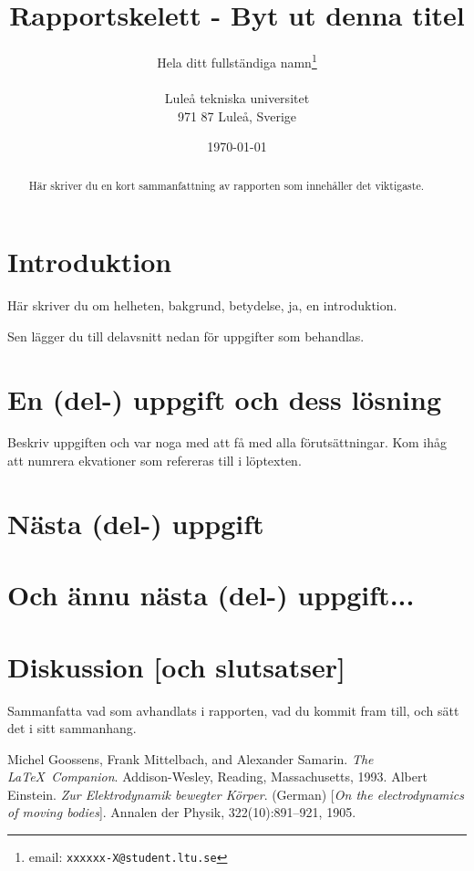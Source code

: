 \documentclass[a4paper,12pt]{article}
\title{Rapportskelett - Byt ut denna titel}
\author{Hela ditt fullständiga namn\thanks{email:
        \texttt{xxxxxx-X@student.ltu.se}}\\  
        ~ \\
        Luleå tekniska universitet \\ 
        971 87 Luleå, Sverige}
\date{\today}
\begin{document}
\linenumbers %

\maketitle

\begin{abstract}
  Här skriver du en kort sammanfattning av rapporten som innehåller
  det viktigaste. 
\end{abstract}

\section{Introduktion}
\label{sec:introduktion}

Här skriver du om helheten, bakgrund, betydelse, ja, en introduktion. 

Sen lägger du till delavsnitt nedan för uppgifter som behandlas.

\section{En (del-) uppgift och dess lösning}
\label{sec:uppg1}

Beskriv uppgiften och var noga med att få med alla förutsättningar.
Kom ihåg att numrera ekvationer som refereras till i löptexten.

\section{Nästa (del-) uppgift}
\label{sec:uppg2}

\section{Och ännu nästa (del-) uppgift...}
\label{sec:uppgN}

\section{Diskussion [och slutsatser]}
\label{sec:disk}

Sammanfatta vad som avhandlats i rapporten, vad du kommit fram till,
och sätt det i sitt sammanhang. 
%
\begin{thebibliography}{99}
%
Michel Goossens, Frank Mittelbach, and Alexander Samarin. 
\textit{The \LaTeX\ Companion}. 
Addison-Wesley, Reading, Massachusetts, 1993.
%
Albert Einstein. 
\textit{Zur Elektrodynamik bewegter K{\"o}rper}. (German) 
[\textit{On the electrodynamics of moving bodies}]. 
Annalen der Physik, 322(10):891–921, 1905.
%
\end{thebibliography}
%
\end{document}
